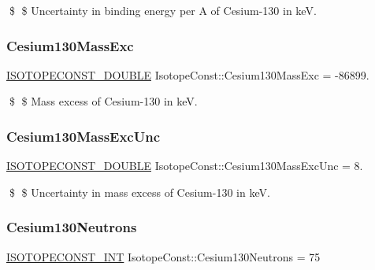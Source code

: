 \$ \$ Uncertainty in binding energy per A of Cesium-\/130 in keV. \mbox{\label{group___isotope_const-_cesium-_cs130_ga0f692e5d7ec70a3fac0d650776e3a410}} 
\subsubsection{\texorpdfstring{Cesium130\+Mass\+Exc}{Cesium130MassExc}}
{\footnotesize\ttfamily \mbox{\hyperlink{group___isotope_const-_macros_ga8f45a7272ce02c0b4c65c44636ed719a}{I\+S\+O\+T\+O\+P\+E\+C\+O\+N\+S\+T\+\_\+\+D\+O\+U\+B\+LE}} Isotope\+Const\+::\+Cesium130\+Mass\+Exc = -\/86899.}

\$ \$ Mass excess of Cesium-\/130 in keV. \mbox{\label{group___isotope_const-_cesium-_cs130_gae67efb01b703c3820a2d9394ea482eca}} 
\subsubsection{\texorpdfstring{Cesium130\+Mass\+Exc\+Unc}{Cesium130MassExcUnc}}
{\footnotesize\ttfamily \mbox{\hyperlink{group___isotope_const-_macros_ga8f45a7272ce02c0b4c65c44636ed719a}{I\+S\+O\+T\+O\+P\+E\+C\+O\+N\+S\+T\+\_\+\+D\+O\+U\+B\+LE}} Isotope\+Const\+::\+Cesium130\+Mass\+Exc\+Unc = 8.}

\$ \$ Uncertainty in mass excess of Cesium-\/130 in keV. \mbox{\label{group___isotope_const-_cesium-_cs130_gadb01c14856a13934399449c21c83959d}} 
\subsubsection{\texorpdfstring{Cesium130\+Neutrons}{Cesium130Neutrons}}
{\footnotesize\ttfamily \mbox{\hyperlink{group___isotope_const-_macros_ga5f18360b3e99483a35c32d789e62621c}{I\+S\+O\+T\+O\+P\+E\+C\+O\+N\+S\+T\+\_\+\+I\+NT}} Isotope\+Const\+::\+Cesium130\+Neutrons = 75}

